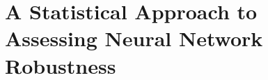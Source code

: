 \vspace{10cm}
\chapter{A Statistical Approach to Assessing Neural Network Robustness}
\label{chp:stat-verification}



